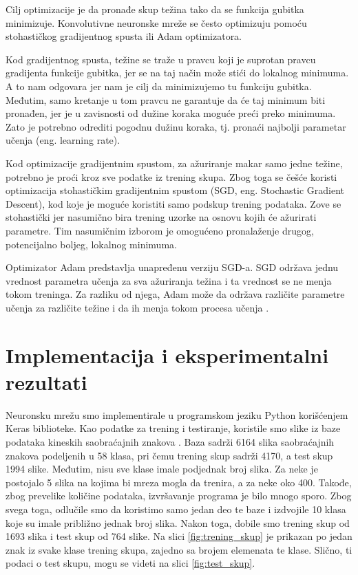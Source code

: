 \documentclass[a4paper]{article}
\begin{document}
Cilj optimizacije je da pronađe skup težina tako da se funkcija gubitka minimizuje. Konvolutivne neuronske mreže se često optimizuju pomoću stohastičkog gradijentnog spusta ili 
Adam optimizatora.

Kod gradijentnog spusta, težine se traže u pravcu koji je suprotan pravcu gradijenta funkcije gubitka, jer se na taj način može stići do lokalnog minimuma. A to nam odgovara jer nam je cilj da minimizujemo tu funkciju gubitka. Međutim, samo kretanje u tom pravcu ne garantuje da će taj minimum biti pronađen, jer je u zavisnosti od dužine koraka moguće preći preko minimuma. Zato je potrebno odrediti pogodnu dužinu koraka, tj. pronaći najbolji parametar učenja (eng. learning rate). 

Kod optimizacije gradijentnim spustom, za ažuriranje makar samo jedne težine, potrebno je proći kroz sve podatke iz trening skupa. Zbog toga se češće koristi optimizacija stohastičkim gradijentnim spustom (SGD, eng. Stochastic Gradient Descent), kod koje je moguće koristiti samo podskup trening podataka. Zove se stohastički jer nasumično bira trening uzorke na osnovu kojih će ažurirati parametre. Tim nasumičnim izborom je omogućeno pronalaženje drugog, potencijalno boljeg, lokalnog minimuma.

Optimizator Adam predstavlja unapređenu verziju SGD-a. SGD održava jednu vrednost parametra učenja za sva ažuriranja težina i ta vrednost se ne menja tokom treninga. Za razliku od njega, Adam može da održava različite parametre učenja za različite težine i da ih menja tokom procesa učenja \cite{Adam}.

\section{Implementacija i eksperimentalni rezultati}
\label{sec:implementacija_i_eksperimentalni_rezultati}


Neuronsku mrežu smo implementirale u programskom jeziku Python korišćenjem Keras biblioteke. Kao podatke za trening i testiranje, koristile smo slike iz baze podataka kineskih saobraćajnih znakova \cite{CTSD}. Baza sadrži 6164 slika saobraćajnih znakova podeljenih u 58 klasa, pri čemu trening skup sadrži 4170, a test skup 1994 slike. Međutim, nisu sve klase imale podjednak broj slika. Za neke je postojalo 5 slika na kojima bi mreza mogla da trenira, a za neke oko 400. Takođe, zbog prevelike količine podataka, izvršavanje programa je bilo mnogo sporo. Zbog svega toga, odlučile smo da koristimo samo jedan deo te baze i izdvojile 10 klasa koje su imale približno jednak broj slika. Nakon toga, dobile smo trening skup od 1693 slika i test skup od 764 slike. Na slici \ref{fig:trening_skup} je prikazan po jedan znak iz svake klase trening skupa, zajedno sa brojem elemenata te klase. Slično, ti podaci o test skupu, mogu se videti na slici \ref{fig:test_skup}.
\end{document}
